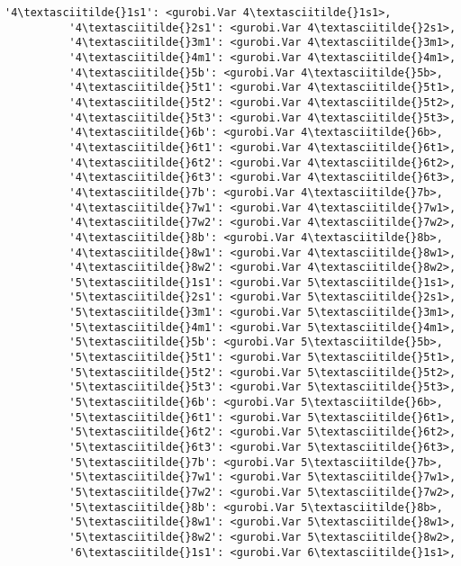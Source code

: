 \documentclass[11pt]{article}
\begin{document}
\begin{Verbatim}[commandchars=\\\{\}]
          '4\textasciitilde{}1s1': <gurobi.Var 4\textasciitilde{}1s1>,
          '4\textasciitilde{}2s1': <gurobi.Var 4\textasciitilde{}2s1>,
          '4\textasciitilde{}3m1': <gurobi.Var 4\textasciitilde{}3m1>,
          '4\textasciitilde{}4m1': <gurobi.Var 4\textasciitilde{}4m1>,
          '4\textasciitilde{}5b': <gurobi.Var 4\textasciitilde{}5b>,
          '4\textasciitilde{}5t1': <gurobi.Var 4\textasciitilde{}5t1>,
          '4\textasciitilde{}5t2': <gurobi.Var 4\textasciitilde{}5t2>,
          '4\textasciitilde{}5t3': <gurobi.Var 4\textasciitilde{}5t3>,
          '4\textasciitilde{}6b': <gurobi.Var 4\textasciitilde{}6b>,
          '4\textasciitilde{}6t1': <gurobi.Var 4\textasciitilde{}6t1>,
          '4\textasciitilde{}6t2': <gurobi.Var 4\textasciitilde{}6t2>,
          '4\textasciitilde{}6t3': <gurobi.Var 4\textasciitilde{}6t3>,
          '4\textasciitilde{}7b': <gurobi.Var 4\textasciitilde{}7b>,
          '4\textasciitilde{}7w1': <gurobi.Var 4\textasciitilde{}7w1>,
          '4\textasciitilde{}7w2': <gurobi.Var 4\textasciitilde{}7w2>,
          '4\textasciitilde{}8b': <gurobi.Var 4\textasciitilde{}8b>,
          '4\textasciitilde{}8w1': <gurobi.Var 4\textasciitilde{}8w1>,
          '4\textasciitilde{}8w2': <gurobi.Var 4\textasciitilde{}8w2>,
          '5\textasciitilde{}1s1': <gurobi.Var 5\textasciitilde{}1s1>,
          '5\textasciitilde{}2s1': <gurobi.Var 5\textasciitilde{}2s1>,
          '5\textasciitilde{}3m1': <gurobi.Var 5\textasciitilde{}3m1>,
          '5\textasciitilde{}4m1': <gurobi.Var 5\textasciitilde{}4m1>,
          '5\textasciitilde{}5b': <gurobi.Var 5\textasciitilde{}5b>,
          '5\textasciitilde{}5t1': <gurobi.Var 5\textasciitilde{}5t1>,
          '5\textasciitilde{}5t2': <gurobi.Var 5\textasciitilde{}5t2>,
          '5\textasciitilde{}5t3': <gurobi.Var 5\textasciitilde{}5t3>,
          '5\textasciitilde{}6b': <gurobi.Var 5\textasciitilde{}6b>,
          '5\textasciitilde{}6t1': <gurobi.Var 5\textasciitilde{}6t1>,
          '5\textasciitilde{}6t2': <gurobi.Var 5\textasciitilde{}6t2>,
          '5\textasciitilde{}6t3': <gurobi.Var 5\textasciitilde{}6t3>,
          '5\textasciitilde{}7b': <gurobi.Var 5\textasciitilde{}7b>,
          '5\textasciitilde{}7w1': <gurobi.Var 5\textasciitilde{}7w1>,
          '5\textasciitilde{}7w2': <gurobi.Var 5\textasciitilde{}7w2>,
          '5\textasciitilde{}8b': <gurobi.Var 5\textasciitilde{}8b>,
          '5\textasciitilde{}8w1': <gurobi.Var 5\textasciitilde{}8w1>,
          '5\textasciitilde{}8w2': <gurobi.Var 5\textasciitilde{}8w2>,
          '6\textasciitilde{}1s1': <gurobi.Var 6\textasciitilde{}1s1>,

\end{Verbatim}
\end{document}
